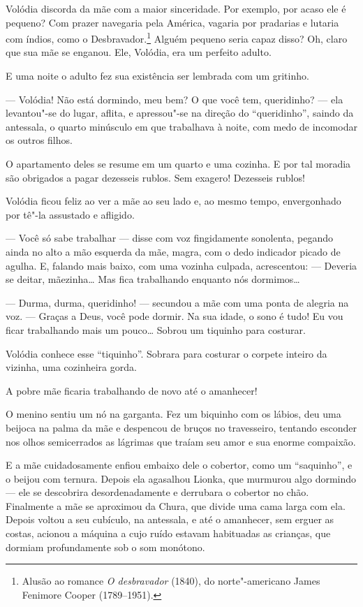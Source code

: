 Volódia discorda da mãe com a maior sinceridade. Por exemplo, por acaso
ele é pequeno? Com prazer navegaria pela América, vagaria por pradarias
e lutaria com índios, como o Desbravador.\footnote{Alusão ao romance
  \emph{O desbravador} (1840), do norte"-americano James Fenimore Cooper
  (1789--1951).} Alguém pequeno seria capaz disso? Oh, claro que sua mãe
se enganou. Ele, Volódia, era um perfeito adulto.

E uma noite o adulto fez sua existência ser lembrada com um gritinho.

--- Volódia! Não está dormindo, meu bem? O que você tem, queridinho? ---
ela levantou"-se do lugar, aflita, e apressou"-se na direção do
``queridinho'', saindo da antessala, o quarto minúsculo em que
trabalhava à noite, com medo de incomodar os outros filhos.

O apartamento deles se resume em um quarto e uma cozinha. E por tal
moradia são obrigados a pagar dezesseis rublos. Sem exagero! Dezesseis
rublos!

Volódia ficou feliz ao ver a mãe ao seu lado e, ao mesmo tempo,
envergonhado por tê"-la assustado e afligido.

--- Você só sabe trabalhar --- disse com voz fingidamente sonolenta,
pegando ainda no alto a mão esquerda da mãe, magra, com o dedo indicador
picado de agulha. E, falando mais baixo, com uma vozinha culpada,
acrescentou: --- Deveria se deitar, mãezinha\ldots{} Mas fica trabalhando
enquanto nós dormimos\ldots{}

--- Durma, durma, queridinho! --- secundou a mãe com uma ponta de
alegria na voz. --- Graças a Deus, você pode dormir. Na sua idade, o
sono é tudo! Eu vou ficar trabalhando mais um pouco\ldots{} Sobrou um
tiquinho para costurar.

Volódia conhece esse ``tiquinho''. Sobrara para costurar o corpete
inteiro da vizinha, uma cozinheira gorda.

A pobre mãe ficaria trabalhando de novo até o amanhecer!

O menino sentiu um nó na garganta. Fez um biquinho com os lábios, deu
uma beijoca na palma da mãe e despencou de bruços no travesseiro,
tentando esconder nos olhos semicerrados as lágrimas que traíam seu amor
e sua enorme compaixão.

E a mãe cuidadosamente enfiou embaixo dele o cobertor, como um
``saquinho'', e o beijou com ternura. Depois ela agasalhou Lionka, que
murmurou algo dormindo --- ele se descobrira desordenadamente e
derrubara o cobertor no chão. Finalmente a mãe se aproximou da Chura,
que divide uma cama larga com ela. Depois voltou a seu cubículo, na
antessala, e até o amanhecer, sem erguer as costas, acionou a máquina a
cujo ruído estavam habituadas as crianças, que dormiam profundamente sob
o som monótono.

